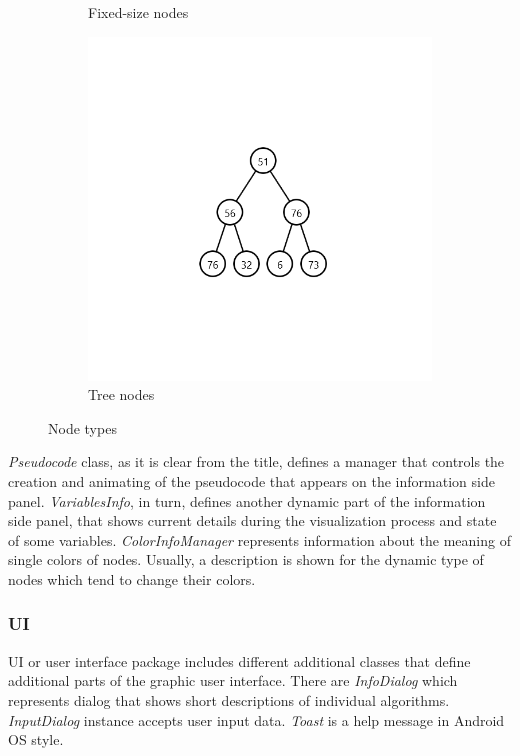 \documentclass[
  field=inf,
  biblatex,
  language=english,
  glossaries,
  theorems=false,
  index
]{kidiplom}
\begin{document}
\begin{figure}[H]
\begin{subfigure}{0.31\textwidth}
		\caption{Fixed-size nodes} \label{fig:1b}
	\end{subfigure}
	\hspace*{\fill} %
	\begin{subfigure}{0.31\textwidth}
		\includegraphics[width=\linewidth]{img/tree.png}
		\caption{Tree nodes} \label{fig:1c}
	\end{subfigure}
	\caption{Node types} \label{fig:1}
\end{figure}

\textit{Pseudocode} class, as it is clear from the title, defines a manager that controls the creation and animating of the pseudocode that appears on the information side panel. \textit{VariablesInfo}, in turn, defines another dynamic part of the information side panel, that shows current details during the visualization process and state of some variables. \textit{ColorInfoManager} represents information about the meaning of single colors of nodes. Usually, a description is shown for the dynamic type of nodes which tend to change their colors.

\subsubsection{UI}
UI or user interface package includes different additional classes that define additional parts of the graphic user interface. There are \textit{InfoDialog} which represents dialog that shows short descriptions of individual algorithms. \textit{InputDialog} instance accepts user input data. \textit{Toast} is a help message in Android OS style.
\end{document}
